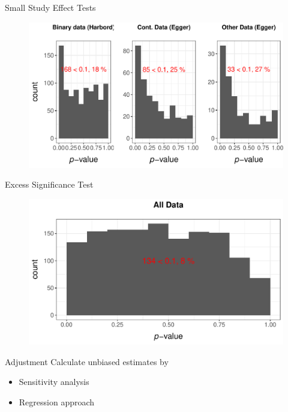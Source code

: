 \documentclass[english]{beamer}\usepackage[]{graphicx}\usepackage[]{color}
\makeatletter
\def\maxwidth{ %
  \ifdim\Gin@nat@width>\linewidth
    \linewidth
  \else
    \Gin@nat@width
  \fi
}
\newenvironment{knitrout}{}{} %
\makeatother
\begin{document}
\begin{frame}[fragile]{Small Study Effect Tests}
\begin{figure}
\begin{knitrout}
\color{fgcolor}
\includegraphics[width=\maxwidth]{figure/unnamed-chunk-4-1} 

\end{knitrout}
\end{figure}
\end{frame}


\begin{frame}[fragile]{Excess Significance Test}
\begin{figure}
\begin{knitrout}
\color{fgcolor}
\includegraphics[width=\maxwidth]{figure/unnamed-chunk-5-1} 

\end{knitrout}
\end{figure}
\end{frame}

\begin{frame}{Adjustment}
Calculate unbiased estimates by
\begin{itemize}
\item Sensitivity analysis
\item Regression approach
\end{itemize}
\end{frame}
\end{document}
